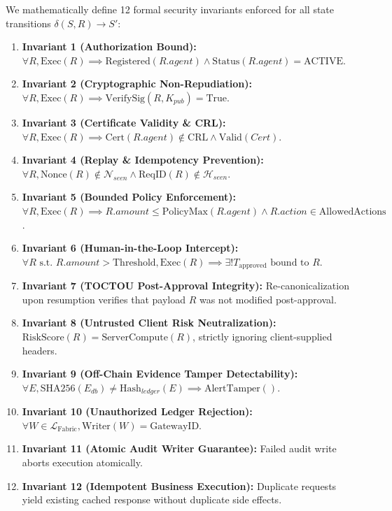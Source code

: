 \documentclass[10pt,journal,compsoc]{IEEEtran}
\begin{document}
We mathematically define 12 formal security invariants enforced for all state transitions $\delta(S, R) \to S'$:

\begin{enumerate}
    \item \textbf{Invariant 1 (Authorization Bound):} $\forall R, \text{Exec}(R) \implies \text{Registered}(R.agent) \land \text{Status}(R.agent) = \text{ACTIVE}$.
    \item \textbf{Invariant 2 (Cryptographic Non-Repudiation):} $\forall R, \text{Exec}(R) \implies \text{VerifySig}(R, K_{pub}) = \text{True}$.
    \item \textbf{Invariant 3 (Certificate Validity & CRL):} $\forall R, \text{Exec}(R) \implies \text{Cert}(R.agent) \notin \text{CRL} \land \text{Valid}(Cert)$.
    \item \textbf{Invariant 4 (Replay & Idempotency Prevention):} $\forall R, \text{Nonce}(R) \notin \mathcal{N}_{seen} \land \text{ReqID}(R) \notin \mathcal{H}_{seen}$.
    \item \textbf{Invariant 5 (Bounded Policy Enforcement):} $\forall R, \text{Exec}(R) \implies R.amount \le \text{PolicyMax}(R.agent) \land R.action \in \text{AllowedActions}$.
    \item \textbf{Invariant 6 (Human-in-the-Loop Intercept):} $\forall R \text{ s.t. } R.amount > \text{Threshold}, \text{Exec}(R) \implies \exists! T_{\text{approved}} \text{ bound to } R$.
    \item \textbf{Invariant 7 (TOCTOU Post-Approval Integrity):} Re-canonicalization upon resumption verifies that payload $R$ was not modified post-approval.
    \item \textbf{Invariant 8 (Untrusted Client Risk Neutralization):} $\text{RiskScore}(R) = \text{ServerCompute}(R)$, strictly ignoring client-supplied headers.
    \item \textbf{Invariant 9 (Off-Chain Evidence Tamper Detectability):} $\forall E, \text{SHA256}(E_{db}) \neq \text{Hash}_{ledger}(E) \implies \text{AlertTamper}()$.
    \item \textbf{Invariant 10 (Unauthorized Ledger Rejection):} $\forall W \in \mathcal{L}_{\text{Fabric}}, \text{Writer}(W) = \text{GatewayID}$.
    \item \textbf{Invariant 11 (Atomic Audit Writer Guarantee):} Failed audit write aborts execution atomically.
    \item \textbf{Invariant 12 (Idempotent Business Execution):} Duplicate requests yield existing cached response without duplicate side effects.
\end{enumerate}
\end{document}
